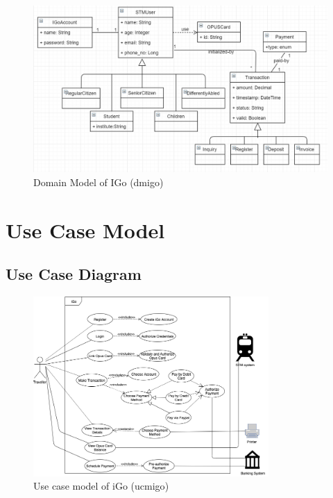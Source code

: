 \documentclass[11pt, english]{report}
\begin{document}
 \begin{figure}[H]
  \includegraphics[width=1.0\textwidth]{images/domainModelSTM.png}
  \centering
  \caption{Domain Model of IGo (\gls{dmigo})}
\end{figure}


\chapter{Use Case Model }
\section{Use Case Diagram}
 \begin{figure}[H]
  
  \includegraphics[width=0.8\textwidth]{images/usecase.png}
  \centering
  \caption{Use case model of iGo (\gls{ucmigo})}

\end{figure}
\end{document}
